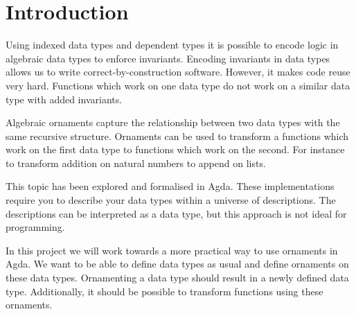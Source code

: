 \section{Introduction}\label{sec:introduction}

Using indexed data types and dependent types it is possible to encode
logic in algebraic data types to enforce invariants.
Encoding invariants in data types allows us to write correct-by-construction
software.
However, it makes code reuse very hard.
Functions which work on one data type do not work on a similar data
type with added invariants.

Algebraic ornaments capture the relationship between two data types
with the same recursive structure.
Ornaments can be used to transform a functions which work on the first
data type to functions which work on the second.
For instance to transform addition on natural numbers to append on lists.

This topic has been explored and formalised in Agda.
These implementations require you to describe your data types within a
universe of descriptions.
The descriptions can be interpreted as a data type, but this approach
is not ideal for programming.

In this project we will work towards a more practical way to use
ornaments in Agda.
We want to be able to define data types as usual and define ornaments
on these data types.
Ornamenting a data type should result in a newly defined data type.
Additionally, it should be possible to transform functions using these
ornaments.


